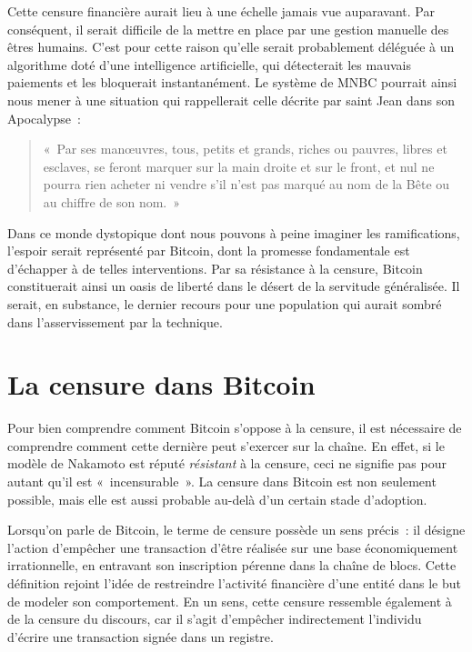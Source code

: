 Cette censure financière aurait lieu à une échelle jamais vue auparavant. Par conséquent, il serait difficile de la mettre en place par une gestion manuelle des êtres humains. C'est pour cette raison qu'elle serait probablement déléguée à un algorithme doté d'une intelligence artificielle, qui détecterait les mauvais paiements et les bloquerait instantanément. Le système de MNBC pourrait ainsi nous mener à une situation qui rappellerait celle décrite par saint Jean dans son Apocalypse~:
\vspace{-0.5em}
\begin{quote}
«~Par ses manœuvres, tous, petits et grands, riches ou pauvres, libres et esclaves, se feront marquer sur la main droite et sur le front, et nul ne pourra rien acheter ni vendre s'il n'est pas marqué au nom de la Bête ou au chiffre de son nom.~»
\end{quote}

Dans ce monde dystopique dont nous pouvons à peine imaginer les ramifications, l'espoir serait représenté par Bitcoin, dont la promesse fondamentale est d'échapper à de telles interventions. Par sa résistance à la censure, Bitcoin constituerait ainsi un oasis de liberté dans le désert de la servitude généralisée. Il serait, en substance, le dernier recours pour une population qui aurait sombré dans l'asservissement par la technique.

\vspace{-1em}
\section*{La censure dans Bitcoin}

Pour bien comprendre comment Bitcoin s'oppose à la censure, il est nécessaire de comprendre comment cette dernière peut s'exercer sur la chaîne. En effet, si le modèle de Nakamoto est réputé \emph{résistant} à la censure, ceci ne signifie pas pour autant qu'il est «~incensurable~». La censure dans Bitcoin est non seulement possible, mais elle est aussi probable au-delà d'un certain stade d'adoption.

Lorsqu'on parle de Bitcoin, le terme de censure possède un sens précis~: il désigne l'action d'empêcher une transaction d'être réalisée sur une base économiquement irrationnelle, en entravant son inscription pérenne dans la chaîne de blocs. Cette définition rejoint l'idée de restreindre l'activité financière d'une entité dans le but de modeler son comportement. En un sens, cette censure ressemble également à de la censure du discours, car il s'agit d'empêcher indirectement l'individu d'écrire une transaction signée dans un registre. %

